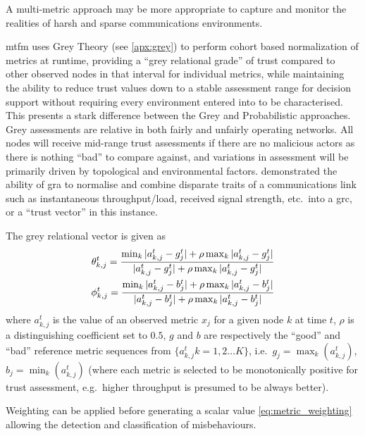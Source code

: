 A multi-metric approach may be more appropriate to capture and monitor the realities of harsh and sparse communications environments.

\gls{mtfm}\cite{Guo11} uses Grey Theory (see \autoref{apx:grey}) to perform cohort based normalization of metrics at runtime, providing a ``grey relational grade'' of trust compared to other observed nodes in that interval for individual metrics, while maintaining the ability to reduce trust values down to a stable assessment range for decision support without requiring every environment entered into to be characterised.
This presents a stark difference between the Grey and Probabilistic approaches.
Grey assessments are relative in both fairly and unfairly operating networks.
All nodes will receive mid-range trust assessments if there are no malicious actors as there is nothing ``bad'' to compare against, and variations in assessment will be primarily driven by topological and environmental factors.
\citet{Guo11} demonstrated the ability of \gls{gra} to normalise and combine disparate traits of a communications link such as instantaneous throughput/load, received signal strength, etc.\ into a \gls{grc}, or a ``trust vector'' in this instance.

The grey relational vector is given as
%
\begin{align}
  \label{eq:grc}
  \theta_{k,j}^t = \frac{\min_k|a_{k,j}^t - g_j^t| + \rho \max_k|a_{k,j}^t-g_j^t|}{|a_{k,j}^t-g_j^t| + \rho \max_k|a_{k,j}^t-g_j^t|} \\
  \phi_{k,j}^t = \frac{\min_k|a_{k,j}^t - b_j^t| + \rho \max_k|a_{k,j}^t-b_j^t|}{|a_{k,j}^t-b_j^t| + \rho \max_k|a_{k,j}^t-b_j^t|} \notag 
\end{align}
%
where $a_{k,j}^t$ is the value of an observed metric $x_j$ for a given node $k$ at time $t$, $\rho$ is a distinguishing coefficient set to $0.5$, $g$ and $b$ are respectively the ``good'' and ``bad'' reference metric sequences from $\{a_{k,j}^t k=1,2\dots K\}$, i.e.\ $g_j=\max_k({a_{k,j}^t})$,  $b_j=\min_k({a_{k,j}^t})$ (where each metric is selected to be monotonically positive for trust assessment, e.g.\ higher throughput is presumed to be always better).

Weighting can be applied before generating a scalar value \eqref{eq:metric_weighting} allowing the detection and classification of misbehaviours.


